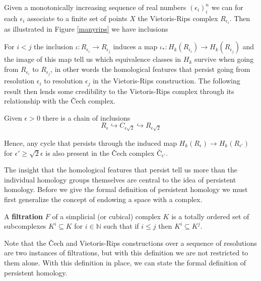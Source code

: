 Given a monotonically increasing sequence of real numbers $(\epsilon_{i})^{n}_{i}$ we can for each $\epsilon_{i}$ associate to a finite set of points $X$ the Vietoris-Rips complex $R_{\epsilon_{i}}$. Then as illustrated in Figure \ref{manyrips} we have inclusions
\begin{center}
\end{center}
For $i<j$ the inclusion $\iota: R_{\epsilon_i} \to R_{\epsilon_{j}}$ induces a map $\iota_{*}: H_{k}(R_{\epsilon_{i}}) \to H_{k}(R_{\epsilon_j})$ and the image of this map tell us which equivalence classes in $H_{k}$ survive when going from $R_{\epsilon_{i}}$ to $R_{\epsilon_{j}}$, in other words the homological features that persist going from resolution $\epsilon_{i}$ to resolution $\epsilon_{j}$ in the Vietoris-Rips construction. The following result then lends some credibility to the Vietoris-Rips complex through its relationship with the Čech complex.
\begin{lemma}
  Given $\epsilon > 0$ there is a chain of inclusions
  \[R_{\epsilon} \hookrightarrow C_{\epsilon \sqrt{2}} \hookrightarrow R_{\epsilon \sqrt{2}}\]
\end{lemma}
Hence, any cycle that persists through the induced map $H_{k}(R_{\epsilon}) \to H_{k}(R_{\epsilon'})$ for $\epsilon'  \geq \sqrt{2} \epsilon$ is also present in the Čech complex $\text{Č}_{\epsilon'}$.

The insight that the homological features that persist tell us more than the individual homology groups themselves are central to the idea of persistent homology. Before we give the formal definition of persistent homology we must first generalize the concept of endowing a space with a complex.

\begin{definition}
A \textbf{filtration} $F$ of a simplicial (or cubical) complex $K$ is a totally ordered set of subcomplexes $K^{i}  \subseteq K$ for $i \in \mathbb{N}$ such that if $i \leq j$ then $K^{i} \subseteq K^{j}$.
\end{definition}

Note that the Čech and Vietoris-Rips constructions over a sequence of resolutions are two instances of filtrations, but with this definition we are not restricted to them alone. With this definition in place, we can state the formal definition of persistent homology.

